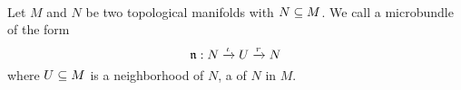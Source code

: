  \\
Let $M$ and $N$ be two topological manifolds with $N \subseteq M$.
We call a microbundle of the form
\[ \mathfrak{n}: N \xrightarrow{\iota} U \xrightarrow{r} N{} \]
where $U \subseteq M$ is a neighborhood of $N$, a  of $N$ in $M$.